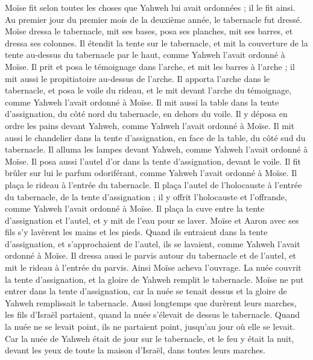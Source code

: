\begin{multicols}{2}
Moïse fit selon toutes les choses que Yahweh lui avait ordonnées ; il le fit ainsi.
Au premier jour du premier mois de la deuxième année, le tabernacle fut dressé.
Moïse dressa le tabernacle, mit ses bases, posa ses planches, mit ses barres, et dressa ses colonnes.
Il étendit la tente sur le tabernacle, et mit la couverture de la tente au-dessus du tabernacle par le haut, comme Yahweh l'avait ordonné à Moïse.
Il prit et posa le témoignage dans l'arche, et mit les barres à l'arche ; il mit aussi le propitiatoire au-dessus de l'arche.
Il apporta l'arche dans le tabernacle, et posa le voile du rideau, et le mit devant l'arche du témoignage, comme Yahweh l'avait ordonné à Moïse.
Il mit aussi la table dans la tente d'assignation, du côté nord du tabernacle, en dehors du voile.
Il y déposa en ordre les pains devant Yahweh, comme Yahweh l'avait ordonné à Moïse.
Il mit aussi le chandelier dans la tente d'assignation, en face de la table, du côté sud du tabernacle.
Il alluma les lampes devant Yahweh, comme Yahweh l'avait ordonné à Moïse.
Il posa aussi l'autel d'or dans la tente d'assignation, devant le voile.
Il fit brûler sur lui le parfum odoriférant, comme Yahweh l'avait ordonné à Moïse.
Il plaça le rideau à l'entrée du tabernacle.
Il plaça l'autel de l'holocauste à l'entrée du tabernacle, de la tente d'assignation ; il y offrit l'holocauste et l’offrande, comme Yahweh l'avait ordonné à Moïse.
Il plaça la cuve entre la tente d'assignation et l'autel, et y mit de l'eau pour se laver.
Moïse et Aaron avec ses fils s’y lavèrent les mains et les pieds.
Quand ils entraient dans la tente d'assignation, et s’approchaient de l'autel, ils se lavaient, comme Yahweh l'avait ordonné à Moïse.
Il dressa aussi le parvis autour du tabernacle et de l'autel, et mit le rideau à l’entrée du parvis. Ainsi Moïse acheva l'ouvrage.
La nuée couvrit la tente d'assignation, et la gloire de Yahweh remplit le tabernacle\FTNT{}.
Moïse ne put entrer dans la tente d'assignation, car la nuée se tenait dessus et la gloire de Yahweh remplissait le tabernacle.
Aussi longtemps que durèrent leurs marches, les fils d’Israël partaient, quand la nuée s’élevait de dessus le tabernacle.
Quand la nuée ne se levait point, ils ne partaient point, jusqu’au jour où elle se levait.
Car la nuée de Yahweh était de jour sur le tabernacle, et le feu y était la nuit, devant les yeux de toute la maison d'Israël, dans toutes leurs marches.
\PPE{}
\end{multicols}
